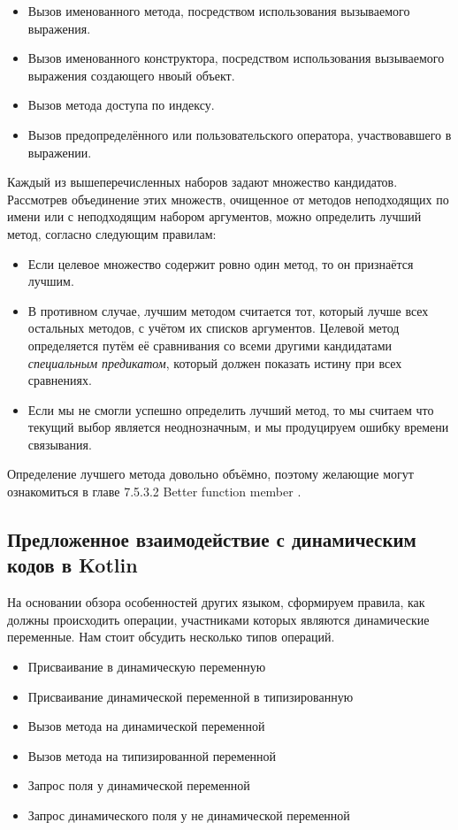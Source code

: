 \begin{itemize}
    \item Вызов именованного метода, посредством использования вызываемого выражения.
    \item Вызов именованного конструктора, посредством использования вызываемого выражения создающего нвоый объект.
    \item Вызов метода доступа по индексу.
    \item Вызов предопределённого или пользовательского оператора, участвовавшего в выражении.
\end{itemize}

Каждый из вышеперечисленных наборов задают множество кандидатов. Рассмотрев объединение этих множеств, очищенное от методов неподходящих по имени или с неподходящим набором аргументов, можно определить лучший метод, согласно следующим правилам:

\begin{itemize}
    \item Если целевое множество содержит ровно один метод, то он признаётся лучшим.
    \item В противном случае, лучшим методом считается тот, который лучше всех остальных методов, с учётом их списков аргументов. Целевой метод определяется путём её сравнивания со всеми другими кандидатами \textit{специальным предикатом}, который должен показать истину при всех сравнениях.
    \item Если мы не смогли успешно определить лучший метод, то мы считаем что текущий выбор является неоднозначным, и мы продуцируем ошибку времени связывания.
\end{itemize}

Определение лучшего метода довольно объёмно, поэтому желающие могут ознакомиться в главе 7.5.3.2 Better function member \cite{csharp:languageSpecification}.


\subsection{Предложенное взаимодействие с динамическим кодов в Kotlin}

На основании обзора особенностей других языком, сформируем правила, как должны происходить операции, участниками которых являются динамические переменные. Нам стоит обсудить несколько типов операций.

\begin{itemize}
    \item Присваивание в динамическую переменную
    \item Присваивание динамической переменной в типизированную
    \item Вызов метода на динамической переменной
    \item Вызов метода на типизированной переменной
    \item Запрос поля у динамической переменной
    \item Запрос динамического поля у не динамической переменной
\end{itemize}

